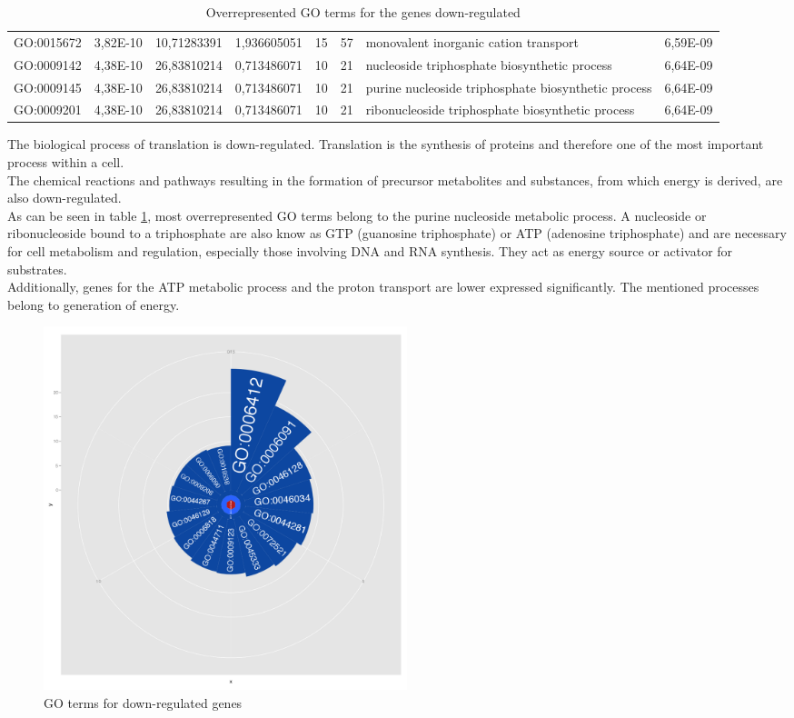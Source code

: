 \documentclass[12pt, a4paper]{report}
\begin{document}
\begin{table}[H]
\begin{tabular}{c|c|c|c|c|c|p{4cm}|c}
GO:0015672&	3,82E-10&	10,71283391&	1,936605051&	15&	57&	monovalent inorganic cation transport&	6,59E-09\\
GO:0009142&	4,38E-10&	26,83810214&	0,713486071&	10&	21&	nucleoside triphosphate biosynthetic process&	6,64E-09\\
GO:0009145&	4,38E-10&	26,83810214&	0,713486071&	10&	21&	purine nucleoside triphosphate biosynthetic process&	6,64E-09\\
GO:0009201&	4,38E-10&	26,83810214&	0,713486071&	10&	21&	ribonucleoside triphosphate biosynthetic process&	6,64E-09\\
\hline
	\end{tabular}
	\caption{Overrepresented GO terms for the genes down-regulated}
	\label{tab:GOdown}
\end{table}

The biological process of translation is down-regulated. Translation is the synthesis of proteins and therefore one of the most important process within a cell.\\
The chemical reactions and pathways resulting in the formation of precursor metabolites and substances, from which energy is derived, are also down-regulated. \\

As can be seen in table \ref{tab:GOdown}, most overrepresented GO terms belong to the purine nucleoside metabolic process. A nucleoside or ribonucleoside bound to a triphosphate are also know as GTP (guanosine triphosphate) or ATP (adenosine triphosphate) and are necessary for cell metabolism and regulation, especially those involving DNA and RNA synthesis. They act as energy source or activator for substrates.\\
Additionally, genes for the ATP metabolic process and the proton transport are lower expressed significantly. The mentioned processes belong to generation of energy. 
\begin{figure}[H]
	\centering	
	\includegraphics[width=300pt]{pics/GO_Down2.png}
	\caption[GO terms for down-regulated genes]
	{GO terms for down-regulated genes}
	\label{fig:godown}
\end{figure}
\end{document}
